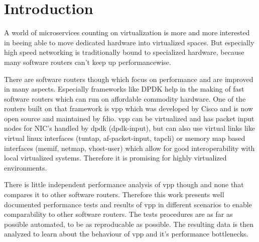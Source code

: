 
\chapter{Introduction}


A world of microservices counting on virtualization is more and
more interested in beeing able to move dedicated hardware into
virtualized spaces. But especially high speed networking is
traditionally bound to specialized hardware, because many software
routers can't keep up performancewise.


There are software routers though which focus on performance and are
improved in many aspects. Especially frameworks like DPDK
\cite{inteldpdk} help in the making of fast software routers which can
run on affordable commodity hardware. One of the routers built on that
framework is \Ac{vpp} which was developed by Cisco and is now open
source and maintained by \Ac{fdio}. \Ac{vpp} can be virtualized and
has packet input nodes for NIC's handled by \Ac{dpdk} (dpdk-input),
but can also use virtual links like virtual linux interfaces (tuntap,
af-packet-input, tapcli) or memory map based interfaces (memif,
netmap, vhost-user) which allow for good interoperability with local
virtualized systems. Therefore it is promising for highly virtualized
environments.




There is little independent performance analysis of \Ac{vpp} though
and none that compares it to other software routers. Therefore this
work presents well documented \cite{my:repo} performance tests and
results of \Ac{vpp} in different scenarios to enable comparability to
other software routers. The tests procedures are as far as possible
automated, to be as reproducable as possible. The resulting data is
then analyzed to learn about the behaviour of \Ac{vpp} and it's
performance bottlenecks.

